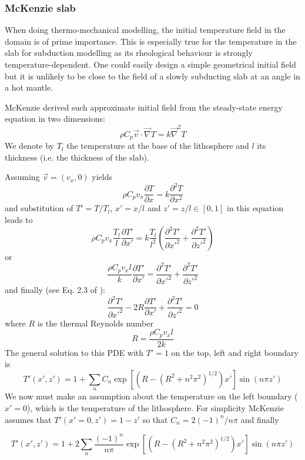 \subsubsection{McKenzie slab}

When doing thermo-mechanical modelling, the initial temperature
field in the domain is of prime importance. This is 
especially true for the temperature in the slab for subduction 
modelling as its rheological behaviour is strongly temperature-dependent. 
One could easily design a simple geometrical initial field but it is 
unlikely to be close to the field of a slowly subducting slab at an angle 
in a hot mantle. 

McKenzie \cite{mcke69} derived such approximate initial field from the 
steady-state energy equation in two dimensions:
\begin{equation}
\rho C_p \vec v \cdot \vec\nabla T = k \vec\nabla^2 T
\end{equation}
We denote by $T_l$ the temperature at the base of the lithosphere
and $l$ its thickness (i.e. the thickness of the slab).

Assuming $\vec v=(v_x,0)$ yields
\[
\rho C_p v_x \frac{\partial T}{\partial x} = k \frac{\partial^2 T}{\partial x^2}
\]
and substitution of $T'=T/T_l$, $x'=x/l$ and $z'=z/l\in[0,1]$ in this equation leads to
\[
\rho C_p v_x \frac{T_l}{l}\frac{\partial T'}{\partial x'} = k \frac{T_l}{l^2}
\left( \frac{\partial^2 T'}{\partial x'^2}
+ \frac{\partial^2 T'}{\partial z'^2} \right)
\]
or 
\[
\frac{\rho C_p v_x l }{k}\frac{\partial T'}{\partial x'} = 
\frac{\partial^2 T'}{\partial x'^2}
+ \frac{\partial^2 T'}{\partial z'^2} 
\]
and finally (see Eq. 2.3 of \cite{mcke69}): 
\[
\frac{\partial^2 T'}{\partial x'^2}
- 2 R \frac{\partial T'}{\partial x'} 
+ \frac{\partial^2 T'}{\partial z'^2} =0
\]
where $R$ is the thermal Reynolds number
\[
R=\frac{\rho C_p v_x l}{2 k}
\] 
The general solution to this PDE with $T'=1$ on the top, left and right boundary is 
\[
T'(x',z')= 1 + \sum_n C_n \exp \left[ \left( R-(R^2+n^2\pi^2)^{1/2} \right) x' \right] \sin (n \pi z')
\]
We now must make an assumption about the temperature on the left boundary ($x'=0$), 
which is the temperature of the lithosphere. 
For simplicity McKenzie assumes that $T'(x'=0,z')=1-z'$ so that $C_n=2(-1)^n/n\pi$ and finally
\begin{mdframed}[backgroundcolor=blue!5]
\begin{equation}
T'(x',z')= 1 + 2\sum_n \frac{(-1)^n}{n \pi} \exp \left[ \left( R-(R^2+n^2\pi^2)^{1/2} \right) x' \right] \sin (n \pi z')
\end{equation}
\end{mdframed}

